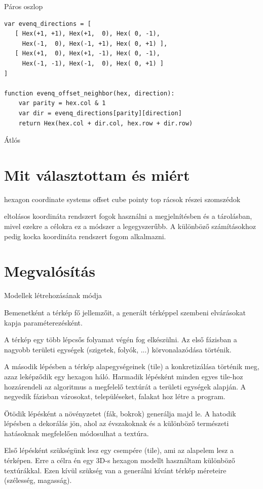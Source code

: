 Páros oszlop

\begin{verbatim}
var evenq_directions = [
   [ Hex(+1, +1), Hex(+1,  0), Hex( 0, -1),
     Hex(-1,  0), Hex(-1, +1), Hex( 0, +1) ],
   [ Hex(+1,  0), Hex(+1, -1), Hex( 0, -1),
     Hex(-1, -1), Hex(-1,  0), Hex( 0, +1) ]
]

function evenq_offset_neighbor(hex, direction):
    var parity = hex.col & 1
    var dir = evenq_directions[parity][direction]
    return Hex(hex.col + dir.col, hex.row + dir.row)
\end{verbatim}

Átlós

\section{Mit választottam és miért}

hexagon
coordinate systems
offset
cube
pointy top
rácsok részei
szomszédok

eltolásos koordináta rendszert fogok használni a megjelnítésben és a tárolásban, mivel ezekre a célokra ez a módszer a legegyszerűbb. A különböző számításokhoz pedig kocka koordináta rendszert fogom alkalmazni.

\section{Megvalósítás}

Modellek létrehozásának módja

Bemenetként a térkép fő jellemzőit, a generált térképpel szembeni elvárásokat kapja paraméterezésként.

A térkép egy több lépcsős folyamat végén fog elkészülni. 
Az első fázisban a nagyobb területi egységek (szigetek, folyók, ...) körvonalazódása történik. 

A második lépésben a térkép alapegységeinek (tile) a konkretizálása történik meg, azaz leképződik egy hexagon háló. 
Harmadik lépésként minden egyes tile-hoz hozzárendeli az algoritmus a megfelelő textúrát a területi egységek alapján. 
A negyedik fázisban városokat, településeket, falakat hoz létre a program. 

Ötödik lépésként a növényzetet (fák, bokrok) generálja majd le. 
A hatodik lépésben a dekorálás jön, ahol az évszakoknak és a különböző természeti hatásoknak megfelelően módosulhat a textúra.

Első lépésként szükségünk lesz egy csempére (tile), ami az alapelem lesz a térképen. Erre a célra én egy 3D-s hexagon modellt használtam különböző textúrákkal.
Ezen kívül szükség van a generálni kívánt térkép méreteire (szélesség, magasság).
